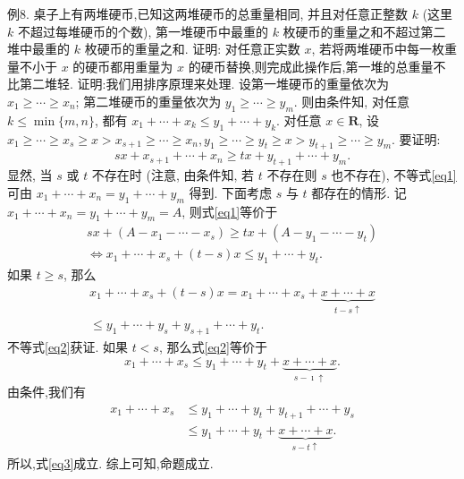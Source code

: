 例8. 桌子上有两堆硬币,已知这两堆硬币的总重量相同, 并且对任意正整数 $k$ (这里 $k$ 不超过每堆硬币的个数), 第一堆硬币中最重的 $k$ 枚硬币的重量之和不超过第二堆中最重的 $k$ 枚硬币的重量之和.
证明: 对任意正实数 $x$, 若将两堆硬币中每一枚重量不小于 $x$ 的硬币都用重量为 $x$ 的硬币替换,则完成此操作后,第一堆的总重量不比第二堆轻.
证明:我们用排序原理来处理.
设第一堆硬币的重量依次为 $x_1 \geqslant \cdots \geqslant x_n$; 第二堆硬币的重量依次为 $y_1 \geqslant \cdots \geqslant y_m$. 则由条件知, 对任意 $k \leqslant \min \{m, n\}$, 都有 $x_1+\cdots+x_k \leqslant y_1+\cdots+y_k$.
对任意 $x \in \mathbf{R}$, 设 $x_1 \geqslant \cdots \geqslant x_s \geqslant x>x_{s+1} \geqslant \cdots \geqslant x_n, y_1 \geqslant \cdots \geqslant y_t \geqslant x>y_{t+1} \geqslant \cdots \geqslant y_m$. 要证明:
$$
s x+x_{s+1}+\cdots+x_n \geqslant t x+y_{t+1}+\cdots+y_m . \label{eq1}
$$
显然, 当 $s$ 或 $t$ 不存在时 (注意, 由条件知, 若 $t$ 不存在则 $s$ 也不存在), 不等式\ref{eq1}可由 $x_1+\cdots+x_n=y_1+\cdots+y_m$ 得到.
下面考虑 $s$ 与 $t$ 都存在的情形.
记 $x_1+\cdots+x_n=y_1+\cdots+y_m=A$, 则式\ref{eq1}等价于
$$
\begin{gathered}
s x+\left(A-x_1-\cdots-x_s\right) \geqslant t x+\left(A-y_1-\cdots-y_t\right) \\
\Leftrightarrow x_1+\cdots+x_s+(t-s) x \leqslant y_1+\cdots+y_t .
\end{gathered} \label{eq2}
$$
如果 $t \geqslant s$, 那么
$$
\begin{gathered}
x_1+\cdots+x_s+(t-s) x=x_1+\cdots+x_s+\underbrace{x+\cdots+x}_{t-s \uparrow} \\
\leqslant y_1+\cdots+y_s+y_{s+1}+\cdots+y_t .
\end{gathered}
$$
不等式\ref{eq2}获证.
如果 $t<s$, 那么式\ref{eq2}等价于
$$
x_1+\cdots+x_s \leqslant y_1+\cdots+y_t+\underbrace{x+\cdots+x}_{s-\imath \uparrow} . \label{eq3}
$$
由条件,我们有
$$
\begin{aligned}
x_1+\cdots+x_s & \leqslant y_1+\cdots+y_t+y_{t+1}+\cdots+y_s \\
& \leqslant y_1+\cdots+y_t+\underbrace{x+\cdots+x}_{s-t \uparrow} .
\end{aligned}
$$
所以,式\ref{eq3}成立.
综上可知,命题成立.


